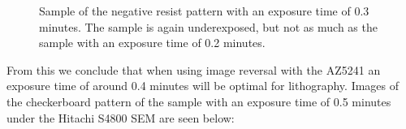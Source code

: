 \begin{figure}[H]
	\centering
	\caption{Sample of the negative resist pattern with an exposure time of 0.3 minutes. The sample is again underexposed, but not as much as the sample with an exposure time of 0.2 minutes.}
	\label{fig:b2i1}
\end{figure}

From this we conclude that when using image reversal with the AZ5241 an exposure time of around 0.4 minutes will be optimal for lithography. Images of the checkerboard pattern of the sample with an exposure time of 0.5 minutes under the Hitachi S4800 SEM are seen below:

